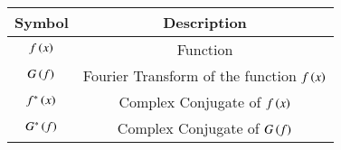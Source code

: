 \begin{tabular}[12pt]{ |c| c|}
    \hline
    \textbf{Symbol} & \textbf{Description}\\ 
    \hline
    $ f\left(x\right) $ & Function \\
    \hline 
    $ G\left(f\right) $ & Fourier Transform of the function $ f\left(x\right) $ \\
    \hline
    $ f^*\left(x\right) $ & Complex Conjugate of $ f\left(x\right) $ \\
    \hline
    $ G^*\left(f\right) $ & Complex Conjugate of $ G\left(f\right) $ \\
    \hline   
    \end{tabular}